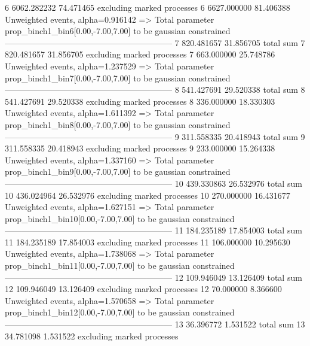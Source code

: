 6          6062.282232     74.471465       excluding marked processes    
6          6627.000000     81.406388       Unweighted events, alpha=0.916142
  => Total parameter prop_binch1_bin6[0.00,-7.00,7.00] to be gaussian constrained
------------------------------------------------------------
7          820.481657      31.856705       total sum                     
7          820.481657      31.856705       excluding marked processes    
7          663.000000      25.748786       Unweighted events, alpha=1.237529
  => Total parameter prop_binch1_bin7[0.00,-7.00,7.00] to be gaussian constrained
------------------------------------------------------------
8          541.427691      29.520338       total sum                     
8          541.427691      29.520338       excluding marked processes    
8          336.000000      18.330303       Unweighted events, alpha=1.611392
  => Total parameter prop_binch1_bin8[0.00,-7.00,7.00] to be gaussian constrained
------------------------------------------------------------
9          311.558335      20.418943       total sum                     
9          311.558335      20.418943       excluding marked processes    
9          233.000000      15.264338       Unweighted events, alpha=1.337160
  => Total parameter prop_binch1_bin9[0.00,-7.00,7.00] to be gaussian constrained
------------------------------------------------------------
10         439.330863      26.532976       total sum                     
10         436.024964      26.532976       excluding marked processes    
10         270.000000      16.431677       Unweighted events, alpha=1.627151
  => Total parameter prop_binch1_bin10[0.00,-7.00,7.00] to be gaussian constrained
------------------------------------------------------------
11         184.235189      17.854003       total sum                     
11         184.235189      17.854003       excluding marked processes    
11         106.000000      10.295630       Unweighted events, alpha=1.738068
  => Total parameter prop_binch1_bin11[0.00,-7.00,7.00] to be gaussian constrained
------------------------------------------------------------
12         109.946049      13.126409       total sum                     
12         109.946049      13.126409       excluding marked processes    
12         70.000000       8.366600        Unweighted events, alpha=1.570658
  => Total parameter prop_binch1_bin12[0.00,-7.00,7.00] to be gaussian constrained
------------------------------------------------------------
13         36.396772       1.531522        total sum                     
13         34.781098       1.531522        excluding marked processes    
